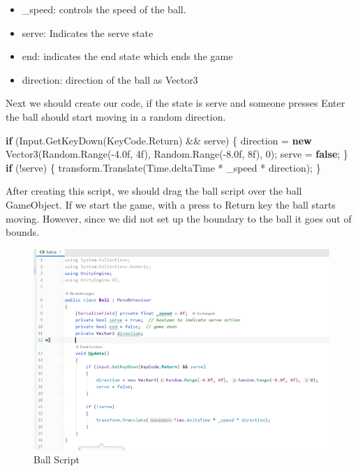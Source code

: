\documentclass[
]{book}
\newenvironment{Shaded}{\begin{snugshade}}{\end{snugshade}}
\newcommand{\DecValTok}[1]{\textcolor[rgb]{0.00,0.00,0.81}{#1}}
\newcommand{\FloatTok}[1]{\textcolor[rgb]{0.00,0.00,0.81}{#1}}
\newcommand{\FunctionTok}[1]{\textcolor[rgb]{0.00,0.00,0.00}{#1}}
\newcommand{\KeywordTok}[1]{\textcolor[rgb]{0.13,0.29,0.53}{\textbf{#1}}}
\newcommand{\NormalTok}[1]{#1}
\providecommand{\tightlist}{%
  \setlength{\itemsep}{0pt}\setlength{\parskip}{0pt}}
\begin{document}
\begin{itemize}
\tightlist
\item
  \_speed: controls the speed of the ball.
\item
  serve: Indicates the serve state
\item
  end: indicates the end state which ends the game
\item
  direction: direction of the ball as Vector3
\end{itemize}

Next we should create our code, if the state is serve and someone presses Enter the ball should start moving in a random direction.

\begin{Shaded}
\begin{Highlighting}[]
\KeywordTok{if}\NormalTok{ (Input.}\FunctionTok{GetKeyDown}\NormalTok{(KeyCode.}\FunctionTok{Return}\NormalTok{) && serve)}
\NormalTok{\{}
\NormalTok{  direction = }\KeywordTok{new} \FunctionTok{Vector3}\NormalTok{(Random.}\FunctionTok{Range}\NormalTok{(-}\FloatTok{4.0f}\NormalTok{, 4f), Random.}\FunctionTok{Range}\NormalTok{(-}\FloatTok{8.0f}\NormalTok{, 8f), }\DecValTok{0}\NormalTok{);}
\NormalTok{  serve = }\KeywordTok{false}\NormalTok{;}
\NormalTok{\}}
\KeywordTok{if}\NormalTok{ (!serve)}
\NormalTok{\{}
\NormalTok{  transform.}\FunctionTok{Translate}\NormalTok{(Time.}\FunctionTok{deltaTime}\NormalTok{ * _speed * direction);}
\NormalTok{\}}
\end{Highlighting}
\end{Shaded}

After creating this script, we should drag the ball script over the ball GameObject. If we start the game, with a press to Return key the ball starts moving. However, since we did not set up the boundary to the ball it goes out of bounds.

\begin{figure}
\centering
\includegraphics{Images/BallScript.png}
\caption{Ball Script}
\end{figure}
\end{document}
